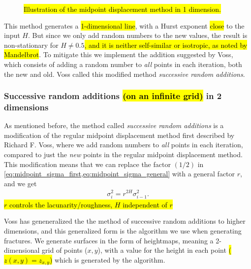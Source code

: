 \begin{figure}
    \centering
    
    \caption{
        \hl{Illustration of the midpoint displacement method in 1 dimension.}
        \label{fig:midpoint01}
    }
\end{figure}

This method generates a \hl{1-dimensional line}, with a Hurst exponent \hl{close} to the input $H$. But since we only add random numbers to the new values, the result is non-stationary for $H \neq 0.5$\cite{voss1985random}\hl{, and it is neither self-similar or isotropic, as noted by Mandelbrot}\cite{mandelbrot1982comment}. To mitigate this we implement the addition suggested by Voss\cite{voss1985random}, which consists of adding a random number to \emph{all} points in each iteration, both the new and old. Voss called this modified method \emph{successive random additions}.

\subsubsection{Successive random additions \hl{(on an infinite grid)} in 2 dimensions}
As mentioned before, the method called \emph{successive random additions} is a modification of the regular midpoint displacement method first described by Richard F. Voss\cite{voss1985random}, where we add random numbers to \emph{all} points in each iteration, compared to just the \emph{new} points in the regular midpoint displacement method. This modification means that we can replace the factor $(1/2)$ in \cref{eq:midpoint_sigma_first,eq:midpoint_sigma_general} with a general factor $r$, and we get
\begin{align*}
    \sigma_i^2 = r^{2H}\sigma^2_{i-1}.
\end{align*}
\hl{$r$ controls the lacunarity/roughness, $H$ independent of $r$}

Voss has geneneralized the the method of successive random additions to higher dimensions\cite{voss1985random}, and this generalized form is the algorithm we use when generating fractures. We generate surfaces in the form of heightmaps, meaning a 2-dimensional grid of points ({$x,y$}), with a value for the height in each point \hl{($z(x,y) = z_{x,y}$)} which is generated by the algorithm.

